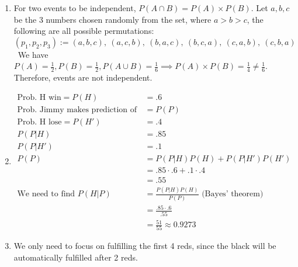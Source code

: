 \documentclass{article}
\begin{document}
\begin{enumerate}[label=(\alph*)]
    \item For two events to be independent, $P(A \cap B) = P(A) \times P(B)$. Let $a,b,c$ be the 3 numbers chosen randomly from the set, where $a>b>c$, the following are all possible permutations:
          \[
              (p_1,p_2,p_3) := (a,b,c),\ (a,c,b),\ (b,a,c),\ (b,c,a),\ (c,a,b),\ (c,b,a)
          \]\
          We have $P(A) = \frac12, P(B) = \frac12, P(A\cup B) = \frac16 \implies P(A)\times P(B) = \frac14 \neq \frac16$. Therefore, events are not independent.
    \item \begin{align*}
              \text{Prob. H win} = P(H)                         & = .6                                               \\
              \text{Prob. Jimmy makes prediction of H team win} & = P(P)                                             \\
              \text{Prob. H lose} = P(H')                       & = .4                                               \\
              P(P | H)                                          & = .85                                              \\
              P(P | H')                                         & = .1                                               \\
              P(P)                                              & = P(P|H)P(H) + P(P|H')P(H')                        \\
                                                                & = .85 \cdot .6 + .1 \cdot .4                       \\
                                                                & = .55                                              \\
              \text{We need to find } P(H|P)                    & = \frac{P(P|H)P(H)}{P(P)} \text{ (Bayes' theorem)} \\
                                                                & = \frac{.85 \cdot .6}{.55}                         \\
                                                                & = \frac{51}{55} \approx 0.9273
          \end{align*}
    \item We only need to focus on fulfilling the first 4 reds, since the black will be automatically fulfilled after 2 reds.

\end{enumerate}
\end{document}

